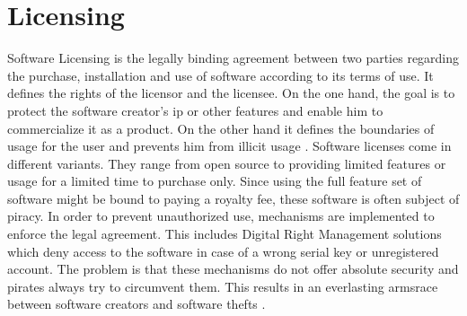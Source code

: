 \section{Licensing} \label{section:introduction-licensing}
Software Licensing is the legally binding agreement between two parties regarding the purchase, installation and use of software according to its terms of use.
It defines the rights of the licensor and the licensee.
On the one hand, the goal is to protect the software creator's \gls{ip} or other features and enable him to commercialize it as a product.
On the other hand it defines the boundaries of usage for the user and prevents him from illicit usage \cite{uncgLicensing}.
\newline
\newline
Software licenses come in different variants.
They range from open source to providing limited features or usage for a limited time to purchase only.
Since using the full feature set of software might be bound to paying a royalty fee, these software is often subject of piracy.
In order to prevent unauthorized use, mechanisms are implemented to enforce the legal agreement.
This includes Digital Right Management solutions which deny access to the software in case of a wrong serial key or unregistered account.
\newline
\newline
The problem is that these mechanisms do not offer absolute security and pirates always try to circumvent them.
This results in an everlasting armsrace between software creators and software thefts \cite{szCopy}.


%

%

%
%

%
%



